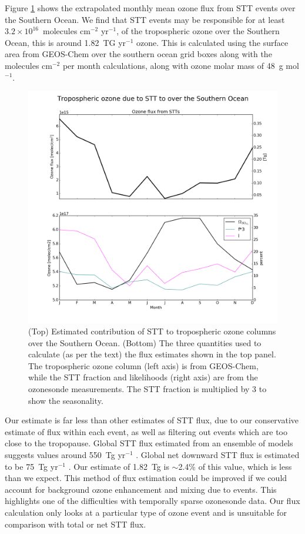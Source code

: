 \documentclass{article}
\begin{document}
  Figure \ref{fig:SOExtrapolation} shows the extrapolated monthly mean ozone flux from STT events over the Southern Ocean.
  We find that STT events may be responsible for at least $3.2 \times10^{16}$~molecules cm$^{-2}$ yr$^{-1}$, of the tropospheric ozone over the Southern Ocean, this is around 1.82~TG yr$^{-1}$ ozone.
  This is calculated using the surface area from GEOS-Chem over the southern ocean grid boxes along with the molecules cm$^{-2}$ per month calculations, along with ozone molar mass of 48~g mol$^{-1}$.
    
  \begin{figure}[!htbp]
    \includegraphics[width=\textwidth]{figures/SO_extrapolation.png}
    \caption{(Top) Estimated contribution of STT to tropospheric ozone columns over the Southern Ocean.
      (Bottom) The three quantities used to calculate (as per the text) the flux estimates shown in the top panel.
      The tropospheric ozone column (left axis) is from GEOS-Chem, while the STT fraction and likelihoods (right axis) are from the ozonesonde measurements.
      The STT fraction is multiplied by 3 to show the seasonality.}
    \label{fig:SOExtrapolation}
  \end{figure}
  
  Our estimate is far less than other estimates of STT flux, due to our conservative estimate of flux within each event, as well as filtering out events which are too close to the tropopause.
  Global STT flux estimated from an ensemble of models suggests values around 550~Tg yr$^{-1}$ \citep{Stevenson2006}.
  Global net downward STT flux is estimated to be 75~Tg yr$^{-1}$ \citep{Sprenger2003}.
  Our estimate of 1.82~Tg is $\sim$2.4\% of this value, which is less than we expect.
  This method of flux estimation could be improved if we could account for background ozone enhancement and mixing due to events.
  This highlights one of the difficulties with temporally sparse ozonesonde data.
  Our flux calculation only looks at a particular type of ozone event and is unsuitable for comparison with total or net STT flux.
  
\end{document}
